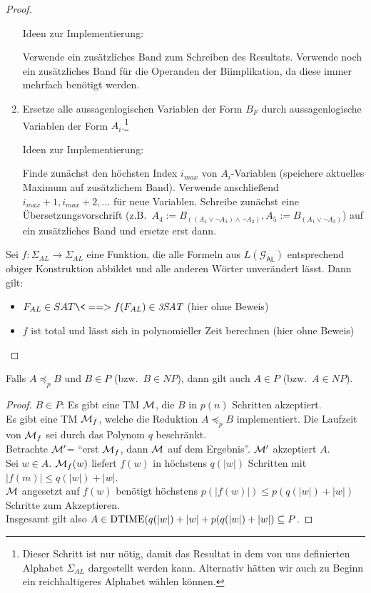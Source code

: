 \begin{proof}
\begin{enumerate}
	Ideen zur Implementierung:
	
	Verwende ein zusätzliches Band zum Schreiben des Resultats.
	Verwende noch ein zusätzliches Band für die Operanden der Biimplikation, da diese immer mehrfach benötigt werden.
  
\item Ersetze alle aussagenlogischen Variablen der Form $B_F$ durch aussagenlogische Variablen der Form $A_i$.\footnote{
Dieser Schritt ist nur nötig, damit das Resultat in dem von uns definierten Alphabet $\Sigma_{AL}$ dargestellt werden kann.
Alternativ hätten wir auch zu Beginn ein reichhaltigeres Alphabet wählen können.
}

	Ideen zur Implementierung:
	
    Finde zunächst den höchsten Index $i_{max}$ von $A_i$-Variablen (speichere aktuelles Maximum auf zusätzlichem Band).
    Verwende anschließend $i_{max}+1, i_{max}+2, \ldots$ für neue Variablen.
    Schreibe zunächst eine Übersetzungsvorschrift (z.B.\ $A_4:=B_{((A_1\lor \neg A_3)\land \neg A_2)}, A_5:=B_{(A_1\lor \neg A_3)}$) auf ein zusätzliches Band und ersetze erst dann.

\end{enumerate}

Sei $f:\Sigma_{AL}\rightarrow\Sigma_{AL}$ eine Funktion, die alle Formeln aus $L(\mathcal{G}_\mathsf{AL})$ entsprechend obiger Konstruktion abbildet und alle anderen Wörter unverändert lässt. Dann gilt:
\begin{itemize}
 \item $F_{AL}\in SAT \<==> f(F_{AL})\in \textit{3SAT}$ (hier ohne Beweis)
 \item $f$ ist total und lässt sich in polynomieller Zeit berechnen (hier ohne Beweis)
 \qedhere
\end{itemize}
\end{proof}



\begin{lemma}\label{lem:A<B + BinP => AinP}
	Falls $A\preceq_p B$ und $B\in P$ (bzw.\ $B\in \textit{NP}$), dann gilt auch $A\in P$ (bzw.\ $A\in \textit{NP}$).
\end{lemma}
\begin{proof}
	$B\in P$: Es gibt eine \ac{TM} $\mathcal{M}$, die $B$ in $p(n)$ Schritten akzeptiert.\\
	Es gibt eine \ac{TM} $\mathcal{M}_f$, welche die Reduktion $A\preceq_p B$ implementiert.
	Die Laufzeit von $\mathcal{M}_f$ sei durch das Polynom $q$ beschränkt.\\
	Betrachte $\mathcal{M}'$= "`erst $\mathcal{M}_f$, dann $\mathcal{M}$ auf dem Ergebnis"'.
	$\mathcal{M}'$ akzeptiert $A$.\\
	Sei $w\in A$.
	$\mathcal{M}_f(w)$ liefert $f(w)$ in höchstens $q(|w|)$ Schritten mit $|f(m)|\leq q(|w|) + |w|$.\\
	$\mathcal{M}$ angesetzt auf $f(w)$ benötigt höchstens $p(|f(w)|)\leq p(q(|w|) + |w|)$ Schritte zum Akzeptieren.\\
	Insgesamt gilt also $A\in \operatorname{DTIME}(q(|w|) + |w|+p(q(|w|) + |w|)\subseteq P$.
\end{proof}



